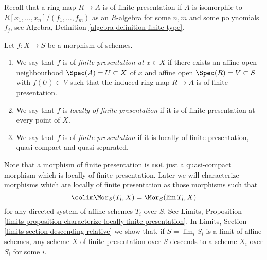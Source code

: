 \noindent
Recall that a ring map $R \to A$ is of finite presentation if
$A$ is isomorphic to $R[x_1, \ldots, x_n]/(f_1, \ldots, f_m)$ as
an $R$-algebra for some $n, m$ and some polynomials $f_j$, see
Algebra, Definition \ref{algebra-definition-finite-type}.

\begin{definition}
\label{definition-finite-presentation}
Let $f : X \to S$ be a morphism of schemes.
\begin{enumerate}
\item We say that $f$ is of {\it finite presentation at $x \in X$} if
there exists an affine open neighbourhood $\Spec(A) = U \subset X$
of $x$ and affine open $\Spec(R) = V \subset S$
with $f(U) \subset V$ such that the induced ring map
$R \to A$ is of finite presentation.
\item We say that $f$ is {\it locally of finite presentation} if it is
of finite presentation at every point of $X$.
\item We say that $f$ is of {\it finite presentation} if it is locally of
finite presentation, quasi-compact and quasi-separated.
\end{enumerate}
\end{definition}

\noindent
Note that a morphism of finite presentation is {\bf not} just a quasi-compact
morphism which is locally of finite presentation.
Later we will characterize morphisms which are
locally of finite presentation as those morphisms such that
$$
\colim \Mor_S(T_i, X) = \Mor_S(\lim T_i, X)
$$
for any directed system of affine schemes $T_i$ over $S$. See
Limits,
Proposition \ref{limits-proposition-characterize-locally-finite-presentation}.
In Limits, Section \ref{limits-section-descending-relative} we show
that, if $S = \lim_i S_i$ is a limit of affine schemes,
any scheme $X$ of finite presentation over $S$ descends to a scheme
$X_i$ over $S_i$ for some $i$.

